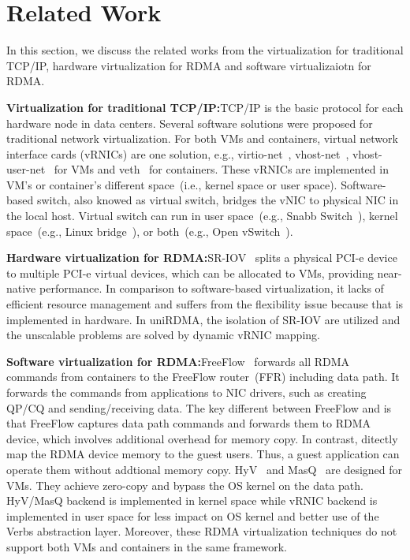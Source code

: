 \section{Related Work} \label{relatedwork}

In this section, we discuss the related works from the virtualization for traditional TCP/IP, hardware virtualization for RDMA and software virtualizaiotn for RDMA.

\textbf{Virtualization for traditional TCP/IP:}\quad TCP/IP is the basic protocol for each hardware node in data centers. Several software solutions were proposed for traditional network virtualization. For both VMs and containers, virtual network interface cards (vRNICs) are one solution, e.g., virtio-net~\cite{virtio-russell2008}, vhost-net~\cite{vhost-net},  vhost-user-net~\cite{vhost-user-net} for VMs and veth~\cite{veth} for containers. These vRNICs are implemented in VM's or container's different space~(i.e., kernel space or user space). Software-based switch, also knowed as virtual switch, bridges the vNIC to physical NIC in the local host. Virtual switch can run in user space~(e.g., Snabb Switch~\cite{snabb}), kernel space~(e.g., Linux bridge~\cite{linux-bridge}), or both~(e.g., Open vSwitch~\cite{ovs-2015}). 

\textbf{Hardware virtualization for RDMA:}\quad SR-IOV~\cite{sr-iov} splits a physical PCI-e device to multiple PCI-e virtual devices, which can be allocated to VMs, providing near-native performance. In comparison to software-based virtualization, it lacks of efficient resource management and suffers from the flexibility issue because that is implemented in hardware. In uniRDMA, the isolation of SR-IOV are utilized and the unscalable problems are solved by dynamic vRNIC mapping. 

\textbf{Software virtualization for RDMA:}\qquad FreeFlow~\cite{kim2019freeflow} forwards all RDMA commands from containers to the FreeFlow router~(FFR) including data path. It forwards the commands from applications to NIC drivers, such as creating QP/CQ and sending/receiving data. The key different between FreeFlow and \sys is that FreeFlow captures data path commands and forwards them to RDMA device, which involves additional overhead for memory copy. In contrast, \sys ditectly map the RDMA device memory to the guest users. Thus, a guest application can operate them without addtional memory copy. HyV~\cite{pfefferle2015hybrid} and MasQ~\cite{he2020masq} are designed for VMs. They achieve zero-copy and bypass the OS kernel on the data path. HyV/MasQ backend is implemented in kernel space while \sys vRNIC backend is implemented in user space for less impact on OS kernel and better use of the Verbs abstraction layer. Moreover, these RDMA virtualization techniques do not support both VMs and containers in the same framework. 